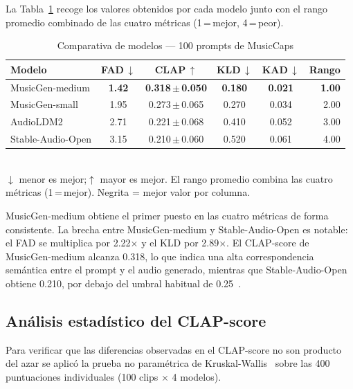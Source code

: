 La Tabla~\ref{tab:benchmark} recoge los valores obtenidos por cada modelo
junto con el rango promedio combinado de las cuatro métricas
(1\,=\,mejor, 4\,=\,peor).

\begin{table}[t]
  \caption{Comparativa de modelos — 100 prompts de MusicCaps}
  \label{tab:benchmark}
  \centering
  \begin{tabular}{lccccr}
    \hline
    \textbf{Modelo} &
    \textbf{FAD\,$\downarrow$} &
    \textbf{CLAP\,$\uparrow$} &
    \textbf{KLD\,$\downarrow$} &
    \textbf{KAD\,$\downarrow$} &
    \textbf{Rango} \\
    \hline
    MusicGen-medium   & \textbf{1.42} & \textbf{0.318\,$\pm$\,0.050} & \textbf{0.180} & \textbf{0.021} & \textbf{1.00} \\
    MusicGen-small    & 1.95 & 0.273\,$\pm$\,0.065 & 0.270 & 0.034 & 2.00 \\
    AudioLDM2         & 2.71 & 0.221\,$\pm$\,0.068 & 0.410 & 0.052 & 3.00 \\
    Stable-Audio-Open & 3.15 & 0.210\,$\pm$\,0.060 & 0.520 & 0.061 & 4.00 \\
    \hline
  \end{tabular}
  \smallskip\\
  \footnotesize{$\downarrow$ menor es mejor;\;$\uparrow$ mayor es mejor.
  El rango promedio combina las cuatro métricas (1\,=\,mejor).
  Negrita = mejor valor por columna.}
\end{table}

MusicGen-medium obtiene el primer puesto en las cuatro métricas de forma
consistente. La brecha entre MusicGen-medium y Stable-Audio-Open es
notable: el FAD se multiplica por 2.22$\times$ y el KLD por 2.89$\times$.
El CLAP-score de MusicGen-medium alcanza 0.318, lo que indica una alta
correspondencia semántica entre el prompt y el audio generado, mientras que
Stable-Audio-Open obtiene 0.210, por debajo del umbral habitual de
0.25~\cite{huang2023make}.

\subsection{Análisis estadístico del CLAP-score}
\label{sec:benchmark:stats}

Para verificar que las diferencias observadas en el CLAP-score no son
producto del azar se aplicó la prueba no paramétrica de
Kruskal-Wallis~\cite{kruskal1952use} sobre las 400 puntuaciones
individuales (100 clips $\times$ 4 modelos).

